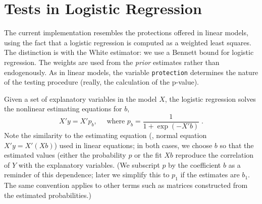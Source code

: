 \documentclass[12pt]{article}
\begin{document}
\section{Tests in Logistic Regression} %

 The current implementation resembles the protections offered in linear models,
 using the fact that a logistic regression is computed as a weighted least
 squares.  The distinction is with the White estimator: we use a Bennett bound
 for logistic regression.  The weights are used from the {\em prior} estimates
 rather than endogenously.  As in linear models, the variable {\tt protection}
 determines the nature of the testing procedure (really, the calculation of the
 p-value).  

 Given a set of explanatory variables in the model $X$, the logistic regression
 solves the nonlinear estimating equations for $b$,
\begin{equation}
  X'y = X'p_b, \quad \mbox{ where } p_b = \frac{1}{1+\exp(-X'b)} \;.
\label{eq:esteq}
\end{equation}
 Note the similarity to the estimating equation (\aka, normal equation $X'y =
 X'(Xb)$) used in linear equations; in both cases, we choose $b$ so that the
 estimated values (either the probability $p$ or the fit $Xb$ reproduce the
 correlation of $Y$ with the explanatory variables.  (We subscript $p$ by the
 coefficient $b$ as a reminder of this dependence; later we simplify this to
 $p_1$ if the estimates are $b_1$. The same convention applies to other terms
 such as matrices constructed from the estimated probabilities.)
\end{document}
